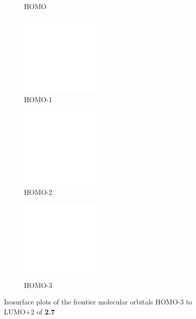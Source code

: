 \begin{figure}[!ht]
\begin{subfigure}[b]{0.31\textwidth}
  \caption{HOMO}
 \end{subfigure}
 \begin{subfigure}[b]{0.31\textwidth}
  \includegraphics[clip=true, width=\textwidth, height=39mm, keepaspectratio]{images/mos/7h-1.eps}
  \caption{HOMO-1}
 \end{subfigure}
 \begin{subfigure}[b]{0.31\textwidth}
  \includegraphics[clip=true, width=\textwidth, height=39mm, keepaspectratio]{images/mos/7h-2.eps}
  \caption{HOMO-2}
 \end{subfigure}
 \begin{subfigure}[b]{0.31\textwidth}
  \includegraphics[clip=true, width=\textwidth, height=39mm, keepaspectratio]{images/mos/7h-3.eps}
  \caption{HOMO-3}
 \end{subfigure}
\caption[Molecular orbitals HOMO-3 to LUMO+2 of \textbf{2.7}]{Isosurface plots of the frontier molecular orbitals HOMO-3 to LUMO+2 of \textbf{2.7}}
\label{fig.mo27}
\end{figure} 

